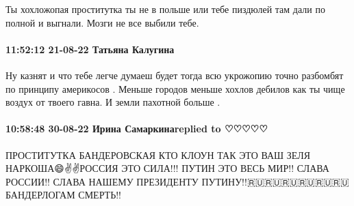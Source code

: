 Ты хохложопая проститутка ты не в польше или тебе пиздюлей там дали по полной и
выгнали. Мозги не все выбили тебе.

\paragraph{11:52:12 21-08-22 Татьяна Калугина}


Ну казнят и что тебе легче думаеш будет тогда всю укрожопию точно разбомбят по
принципу америкосов . Меньше городов меньше хохлов дебилов как ты чище воздух
от твоего гавна. И земли пахотной больше .

\paragraph{10:58:48 30-08-22 Ирина Самаркинаreplied to ♡♡♡♡♡}

ПРОСТИТУТКА БАНДЕРОВСКАЯ КТО КЛОУН ТАК ЭТО ВАШ ЗЕЛЯ НАРКОША😄✌️✌️РОССИЯ ЭТО
СИЛА!!! ПУТИН ЭТО ВЕСЬ МИР!! СЛАВА РОССИИ!! СЛАВА НАШЕМУ ПРЕЗИДЕНТУ
ПУТИНУ!!🇷🇺🇷🇺🇷🇺🇷🇺🇷🇺🇷🇺 БАНДЕРЛОГАМ СМЕРТЬ!!






